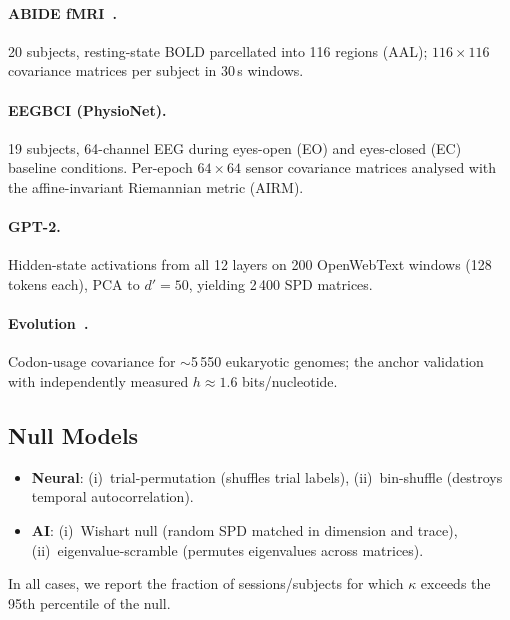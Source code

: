 \documentclass[letterpaper]{article}
\begin{document}
\paragraph{ABIDE fMRI~\citep{dimauro2014}.}
20 subjects, resting-state BOLD parcellated into 116
regions (AAL); $116\times 116$ covariance matrices per
subject in 30\,s windows.

\paragraph{EEGBCI (PhysioNet).}
19 subjects, 64-channel EEG during eyes-open (EO) and
eyes-closed (EC) baseline conditions.
Per-epoch $64\times 64$ sensor covariance matrices
analysed with the affine-invariant Riemannian metric
(AIRM).

\paragraph{GPT-2.}
Hidden-state activations from all 12 layers on 200
OpenWebText windows (128 tokens each), PCA to $d'=50$,
yielding 2\,400 SPD matrices.

\paragraph{Evolution~\citep{fenn2025evolution}.}
Codon-usage covariance for $\sim$5\,550 eukaryotic
genomes; the anchor validation with independently
measured $h\approx1.6$ bits/nucleotide.

\subsection{Null Models}

\begin{itemize}[nosep,leftmargin=*]
  \item \textbf{Neural}: (i)~trial-permutation
    (shuffles trial labels), (ii)~bin-shuffle (destroys
    temporal autocorrelation).
  \item \textbf{AI}: (i)~Wishart null (random SPD
    matched in dimension and trace),
    (ii)~eigenvalue-scramble (permutes eigenvalues across
    matrices).
\end{itemize}
In all cases, we report the fraction of
sessions/subjects for which $\kappa$ exceeds the 95th
percentile of the null.

\end{document}
